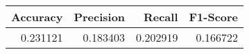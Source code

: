 \begin{tabular}{rrrr}
\toprule
 Accuracy &  Precision &   Recall &  F1-Score \\
\midrule
 0.231121 &   0.183403 & 0.202919 &  0.166722 \\
\bottomrule
\end{tabular}
